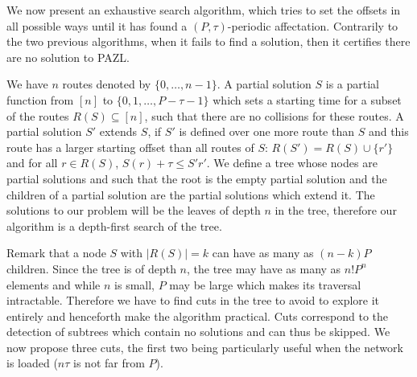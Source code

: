 \documentclass[a4paper,10pt]{article}
\begin{document}
% 	    
      We now present an exhaustive search algorithm, which tries to set the offsets in all possible ways until it has found a $(P,\tau)$-periodic affectation. Contrarily to the two previous algorithms, when it fails to find a solution, then it certifies there are no solution to PAZL.
      
      We have $n$ routes denoted by $\{0,\dots,n-1\}$. A partial solution $S$ is 
      a partial function from $[n]$ to $\{0,1,\dots,P-\tau -1\}$ which sets a starting time for a subset of the routes $R(S) \subseteq [n]$, such that there are no collisions for these routes.  A partial solution $S'$ extends $S$, if $S'$ is defined over one more route than $S$ and this route has a larger starting offset than all routes of $S$: $R(S') = R(S) \cup \{r'\}$ and for all  $r \in R(S)$, $S(r) + \tau \leq S'{r'}$. We define a tree whose nodes are partial solutions and such that the root is the empty partial solution and 
      the children of a partial solution are the partial solutions which extend it. The solutions to our problem will be the leaves of depth $n$ in the tree, therefore our algorithm is a depth-first search of the tree. 
      
      Remark that a node $S$ with $|R(S)| = k$ can have as many as $(n-k)P$ children. Since the tree is of depth $n$, the tree may have as many as $n!P^n$ elements and while $n$ is small, $P$ may be large which makes its traversal intractable.  Therefore we have to find cuts in the tree to avoid to explore it entirely and henceforth make the algorithm practical. Cuts correspond to the detection of subtrees which contain no solutions and can thus be skipped.   
      We now propose three cuts, the first two being particularly useful when the network is loaded ($n\tau$ is not far from $P$). 
      
\end{document}
